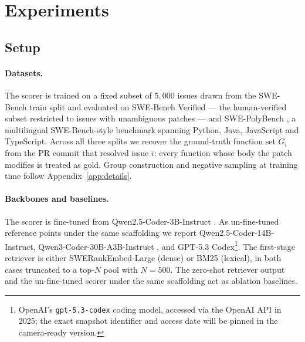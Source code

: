 \section{Experiments}
\label{sec:experiments}


\subsection{Setup}
\label{sec:setup-exp}

\paragraph{Datasets.}
The scorer is trained on a fixed subset of $5{,}000$ issues drawn
from the SWE-Bench train split \citep{jimenez2024swebench} and
evaluated on SWE-Bench Verified \citep{jimenez2024swebench} ---
the human-verified subset restricted to issues with unambiguous
patches --- and SWE-PolyBench \citep{chaudhari2025spider}, a
multilingual SWE-Bench-style benchmark spanning Python, Java,
JavaScript and TypeScript. Across all three splits we recover the
ground-truth function set $G_i$ from the PR commit that resolved
issue $i$: every function whose body the patch modifies is treated
as gold. Group construction and negative sampling at training time
follow Appendix~\ref{app:details}.

\paragraph{Backbones and baselines.}
The scorer is fine-tuned from Qwen2.5-Coder-3B-Instruct
\citep{hui2024qwen25codertechnicalreport}. As un-fine-tuned
reference points under the same scaffolding we report
Qwen2.5-Coder-14B-Instruct, Qwen3-Coder-30B-A3B-Instruct
\citep{yang2025qwen3}, and GPT-5.3
Codex\footnote{OpenAI's \texttt{gpt-5.3-codex} coding model,
accessed via the OpenAI API in 2025; the exact snapshot
identifier and access date will be pinned in the camera-ready
version.}. The first-stage retriever is either SWERankEmbed-Large
\citep{reddy2025sweranksoftwareissuelocalization} (dense) or BM25
(lexical), in both cases truncated to a top-$N$ pool with
$N{=}500$. The zero-shot retriever output and the un-fine-tuned
scorer under the same scaffolding act as ablation baselines.

